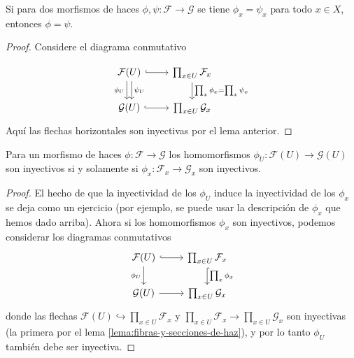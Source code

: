 \documentclass{article}
\numberwithin{equation}{section}
\theoremstyle{definition}
\begin{document}
\begin{corolario}
  Si para dos morfismos de haces $\phi,\psi\colon \mathcal{F} \to \mathcal{G}$
  se tiene $\phi_x = \psi_x$ para todo $x\in X$, entonces $\phi = \psi$.

  \begin{proof}
    Considere el diagrama conmutativo

    \[ \begin{tikzcd}
        \mathcal{F} (U) \ar[hookrightarrow]{r}\ar[shift right=0.25em]{d}[swap]{\phi_U}\ar[shift left=0.25em]{d}{\psi_U} & \prod_{x\in U} \mathcal{F}_x\ar{d}{\prod_x \phi_x = \prod_x \psi_x} \\
        \mathcal{G} (U) \ar[hookrightarrow]{r} & \prod_{x\in U} \mathcal{G}_x
      \end{tikzcd} \]
    Aquí las flechas horizontales son inyectivas por el lema anterior.
  \end{proof}
\end{corolario}

\begin{proposicion}
  \label{prop:inyectividad-y-las-fibras}
  Para un morfismo de haces $\phi\colon \mathcal{F} \to \mathcal{G}$
  los homomorfismos $\phi_U\colon \mathcal{F} (U) \to \mathcal{G} (U)$ son
  inyectivos si y solamente si $\phi_x\colon \mathcal{F}_x \to \mathcal{G}_x$
  son inyectivos.

  \begin{proof}
    El hecho de que la inyectividad de los $\phi_U$ induce la inyectividad
    de los $\phi_x$ se deja como un ejercicio (por ejemplo, se puede usar
    la descripción de $\phi_x$ que hemos dado arriba). Ahora si
    los homomorfismos $\phi_x$ son inyectivos, podemos considerar los diagramas
    conmutativos
    \[ \begin{tikzcd}
        \mathcal{F} (U) \ar[hookrightarrow]{r}\ar{d}[swap]{\phi_U} & \prod_{x\in U} \mathcal{F}_x\ar[hookrightarrow]{d}{\prod_x \phi_x} \\
        \mathcal{G} (U) \ar{r} & \prod_{x\in U} \mathcal{G}_x
      \end{tikzcd} \]
    donde las flechas
    $\mathcal{F} (U) \hookrightarrow \prod_{x\in U} \mathcal{F}_x$ y
    $\prod_{x\in U} \mathcal{F}_x \to \prod_{x\in U} \mathcal{G}_x$ son
    inyectivas (la primera por el lema \ref{lema:fibras-y-secciones-de-haz}), y
    por lo tanto $\phi_U$ también debe ser inyectiva.
  \end{proof}
\end{proposicion}
\end{document}
